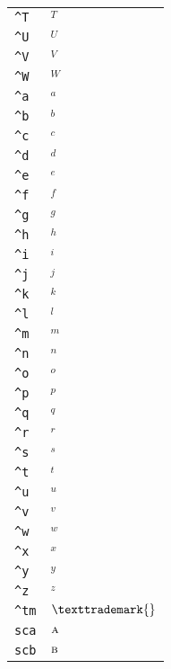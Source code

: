 \begin{longtable}{ll}
\texttt{\textasciicircum T}&${}^T{}$\\
\texttt{\textasciicircum U}&${}^U{}$\\
\texttt{\textasciicircum V}&${}^V{}$\\
\texttt{\textasciicircum W}&${}^W{}$\\
\texttt{\textasciicircum a}&${}^a{}$\\
\texttt{\textasciicircum b}&${}^b{}$\\
\texttt{\textasciicircum c}&${}^c{}$\\
\texttt{\textasciicircum d}&${}^d{}$\\
\texttt{\textasciicircum e}&${}^e{}$\\
\texttt{\textasciicircum f}&${}^f{}$\\
\texttt{\textasciicircum g}&${}^g{}$\\
\texttt{\textasciicircum h}&${}^h{}$\\
\texttt{\textasciicircum i}&${}^i{}$\\
\texttt{\textasciicircum j}&${}^j{}$\\
\texttt{\textasciicircum k}&${}^k{}$\\
\texttt{\textasciicircum l}&${}^l{}$\\
\texttt{\textasciicircum m}&${}^m{}$\\
\texttt{\textasciicircum n}&${}^n{}$\\
\texttt{\textasciicircum o}&${}^o{}$\\
\texttt{\textasciicircum p}&${}^p{}$\\
\texttt{\textasciicircum q}&${}^q{}$\\
\texttt{\textasciicircum r}&${}^r{}$\\
\texttt{\textasciicircum s}&${}^s{}$\\
\texttt{\textasciicircum t}&${}^t{}$\\
\texttt{\textasciicircum u}&${}^u{}$\\
\texttt{\textasciicircum v}&${}^v{}$\\
\texttt{\textasciicircum w}&${}^w{}$\\
\texttt{\textasciicircum x}&${}^x{}$\\
\texttt{\textasciicircum y}&${}^y{}$\\
\texttt{\textasciicircum z}&${}^z{}$\\
\texttt{\textasciicircum tm}&${}\texttrademark{}$\\
\texttt{sca}&${}{\textsc{a}}{}$\\
\texttt{scb}&${}{\textsc{b}}{}$\\

\end{longtable}
